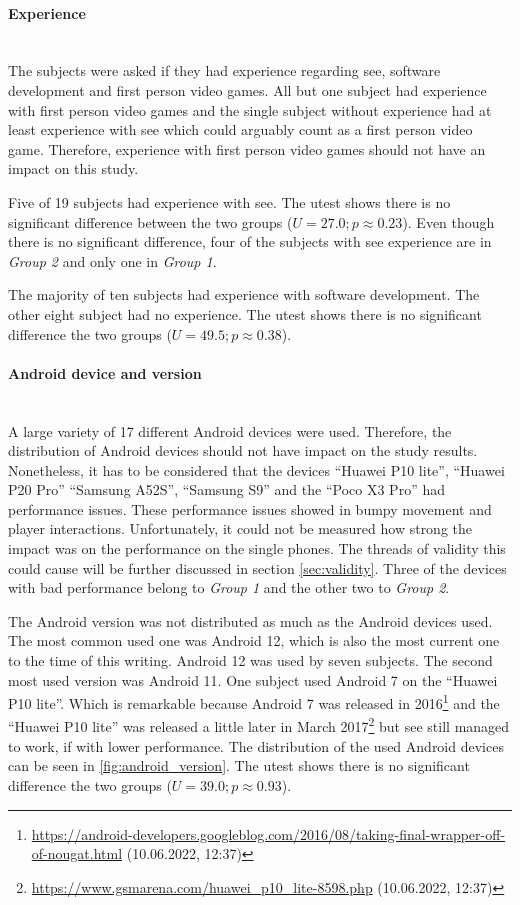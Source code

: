 \paragraph{Experience}\mbox{}\\
The subjects were asked if they had experience regarding \gls{see}, software development and first person video games.
All but one subject had experience with first person video games and the single subject without experience had at least experience with \gls{see} which could arguably count as a first person video game.
Therefore, experience with first person video games should not have an impact on this study.

Five of 19 subjects had experience with \gls{see}.
The \gls{utest} shows there is no significant difference between the two groups ($U = 27.0; p \approx 0.23$).
Even though there is no significant difference, four of the subjects with \gls{see} experience are in \textit{Group 2} and only one in \textit{Group 1}.

The majority of ten subjects had experience with software development.
The other eight subject had no experience.
The \gls{utest} shows there is no significant difference the two groups ($U = 49.5; p \approx 0.38$).

\paragraph{Android device and version}\mbox{}\\
A large variety of 17 different Android devices were used.
Therefore, the distribution of Android devices should not have impact on the study results.
Nonetheless, it has to be considered that the devices \enquote{Huawei P10 lite}, \enquote{Huawei P20 Pro} \enquote{Samsung A52S}, \enquote{Samsung S9} and the \enquote{Poco X3 Pro} had performance issues.
These performance issues showed in bumpy movement and player interactions.
Unfortunately, it could not be measured how strong the impact was on the performance on the single phones.
The threads of validity this could cause will be further discussed in section \ref{sec:validity}.
Three of the devices with bad performance belong to \textit{Group 1} and the other two to \textit{Group 2}.

The Android version was not distributed as much as the Android devices used. 
The most common used one was Android 12, which is also the most current one to the time of this writing.
Android 12 was used by seven subjects.
The second most used version was Android 11.
One subject used Android 7 on the \enquote{Huawei P10 lite}.
Which is remarkable because Android 7 was released in 2016\footnote{\url{https://android-developers.googleblog.com/2016/08/taking-final-wrapper-off-of-nougat.html} (10.06.2022, 12:37)} and the \enquote{Huawei P10 lite} was released a little later in March 2017\footnote{\url{https://www.gsmarena.com/huawei_p10_lite-8598.php} (10.06.2022, 12:37)} but \gls{see} still managed to work, if with lower performance.
The distribution of the used Android devices can be seen in \ref{fig:android_version}.
The \gls{utest} shows there is no significant difference the two groups ($U = 39.0; p \approx 0.93$).

